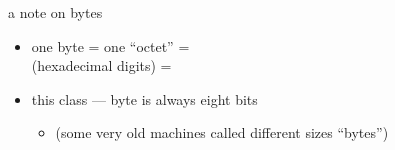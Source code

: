 \begin{frame}{a note on bytes}
    \begin{itemize}
        \item one byte = one ``octet'' = \\
              (hexadecimal digits) = \\
        \vspace{.5cm}
        \item this class --- byte is always eight bits
            \begin{itemize}
                \item (some very old machines called different sizes ``bytes'')
            \end{itemize}
    \end{itemize}
\end{frame}
